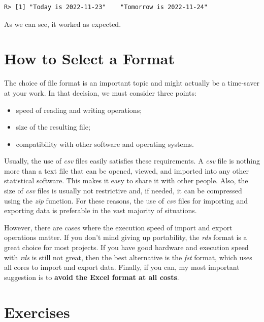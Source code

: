 \documentclass[
  12pt,
]{book}
\providecommand{\tightlist}{%
  \setlength{\itemsep}{0pt}\setlength{\parskip}{0pt}}
\begin{document}
\begin{verbatim}
R> [1] "Today is 2022-11-23"    "Tomorrow is 2022-11-24"
\end{verbatim}

As we can see, it worked as expected.

\hypertarget{how-to-select-a-format}{%
\section{How to Select a Format}\label{how-to-select-a-format}}

The choice of file format is an important topic and might actually be a time-saver at your work. In that decision, we must consider three points:

\begin{itemize}
\tightlist
\item
  speed of reading and writing operations;
\item
  size of the resulting file;
\item
  compatibility with other software and operating systems.
\end{itemize}

Usually, the use of \emph{csv} files easily satisfies these requirements. A \emph{csv} file is nothing more than a text file that can be opened, viewed, and imported into any other statistical software. This makes it easy to share it with other people. Also, the size of \emph{csv} files is usually not restrictive and, if needed, it can be compressed using the \emph{zip} function. For these reasons, the use of \emph{csv} files for importing and exporting data is preferable in the vast majority of situations. 

However, there are cases where the execution speed of import and export operations matter. If you don't mind giving up portability, the \emph{rds} format is a great choice for most projects. If you have good hardware and execution speed with \emph{rds} is still not great, then the best alternative is the \emph{fst} format, which uses all cores to import and export data. Finally, if you can, my most important suggestion is to \textbf{avoid the Excel format at all costs}.

\hypertarget{exerc-importacao-exportacao}{%
\section{Exercises}\label{exerc-importacao-exportacao}}
\end{document}
